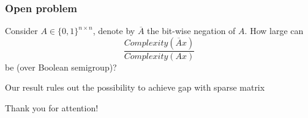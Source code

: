 \documentclass{beamer}
\begin{document}
\begin{frame}
\frametitle{Open problem}

\begin{problem}[Jukna '19]
Consider $A \in \{0,1\}^{n\times n}$, denote by $\overline{A}$ the bit-wise negation of $A$. How large can
$$
\frac{Complexity(\overline{A}x)}{Complexity(Ax)}
$$ 
be (over Boolean semigroup)?
\end{problem}

\pause
\medskip
Our result rules out the possibility to achieve gap with sparse matrix

\pause
\medskip
Thank you for attention!

\end{frame}
\end{document}
